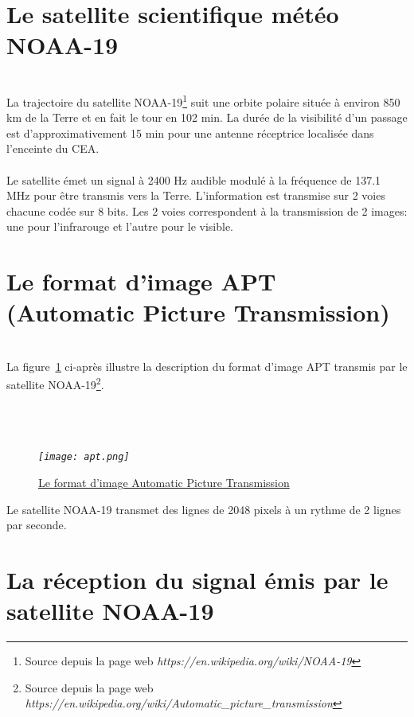\documentclass[12pt,fleqn]{book} %
\begin{document}
\section{Le satellite scientifique météo NOAA-19}
~\\\indent La trajectoire du satellite NOAA-19\footnote{Source depuis la page web \emph{https://en.wikipedia.org/wiki/NOAA-19}} suit une orbite polaire située à environ 850 km de la Terre et en fait le tour en 102 min. La durée de la visibilité d'un passage est d'approximativement 15 min pour une antenne réceptrice localisée dans l'enceinte du CEA.
~\\\\Le satellite émet un signal à 2400 Hz audible modulé à la fréquence de 137.1 MHz pour être transmis vers la Terre. L'information est transmise sur 2 voies chacune codée sur 8 bits. Les 2 voies correspondent à la transmission de 2 images: une pour l'infrarouge et l'autre pour le visible.
\section{Le format d'image APT (Automatic Picture Transmission)}
~\\\indent La figure~\underline{\color{blue}\ref{apt}} ci-après illustre la description du format d'image APT transmis par le satellite NOAA-19\footnote{Source depuis la page web \emph{https://en.wikipedia.org/wiki/Automatic\_picture\_transmission}}.
~\\\\
~\\\\
\begin{figure}[H]
	\centering
	\itshape
	\texttt{[image: apt.png]}
	\caption{\label{apt} \underline{Le format d'image Automatic Picture Transmission}}
\end{figure}
Le satellite NOAA-19 transmet des lignes de 2048 pixels à un rythme de 2 lignes par seconde.
\section{La réception du signal émis par le satellite NOAA-19}
\end{document}
